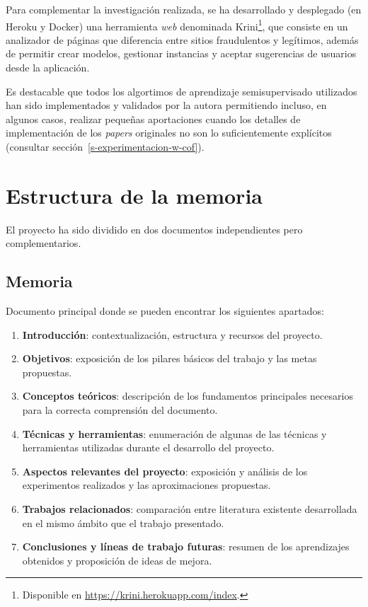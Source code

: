 Para complementar la investigación realizada, se ha desarrollado y desplegado (en Heroku y Docker) una herramienta \textit{web} denominada Krini\footnote{Disponible en \url{https://krini.herokuapp.com/index}.}, que consiste en un analizador de páginas que diferencia entre sitios fraudulentos y legítimos, además de permitir crear modelos, gestionar instancias y aceptar sugerencias de usuarios desde la aplicación.

Es destacable que todos los algortimos de aprendizaje semisupervisado utilizados han sido implementados y validados por la autora permitiendo incluso, en algunos casos, realizar pequeñas aportaciones cuando los detalles de implementación de los \textit{papers} originales no son lo suficientemente explícitos (consultar sección~\ref{s-experimentacion-w-cof}).


\section{Estructura de la memoria}

El proyecto ha sido dividido en dos documentos independientes pero complementarios.

\subsection{Memoria}

Documento principal donde se pueden encontrar los siguientes apartados:

\begin{enumerate}
	\item \textbf{Introducción}: contextualización, estructura y recursos del proyecto.
	\item \textbf{Objetivos}: exposición de los pilares básicos del trabajo y las metas propuestas.
	\item \textbf{Conceptos teóricos}: descripción de los fundamentos principales necesarios para la correcta comprensión del documento.
	\item \textbf{Técnicas y herramientas}: enumeración de algunas de las técnicas y herramientas utilizadas durante el desarrollo del proyecto.
	\item \textbf{Aspectos relevantes del proyecto}: exposición y análisis de los experimentos realizados y las aproximaciones propuestas.
	\item \textbf{Trabajos relacionados}: comparación entre literatura existente desarrollada en el mismo ámbito que el trabajo presentado.
	\item \textbf{Conclusiones y líneas de trabajo futuras}: resumen de los aprendizajes obtenidos y proposición de ideas de mejora.
\end{enumerate}

